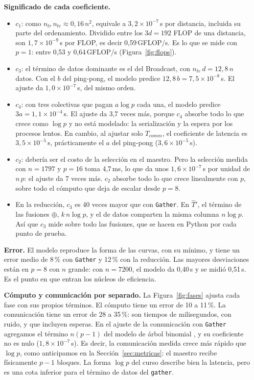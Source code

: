 \documentclass[11pt,a4paper]{article}
\newcommand{\ntr}{n_{tr}}
\newcommand{\nte}{n_{te}}
\begin{document}
\textbf{Significado de cada coeficiente.}
\begin{itemize}
  \item $c_1$: como $\ntr\,\nte\approx 0{,}16\,n^2$, equivale a $3{,}2\times10^{-7}$\,s por distancia, incluida su parte del ordenamiento. Dividido entre los $3d=192$ FLOP de una distancia, son $1{,}7\times10^{-9}$\,s por FLOP, es decir 0,59\,GFLOP/s. Es lo que se mide con $p=1$: entre 0,53 y 0,64\,GFLOP/s (Figura~\ref{fig:flops}).
  \item $c_3$: el término de datos dominante es el del Broadcast, con $\nte\,d=12{,}8\,n$ datos. Con el $b$ del ping-pong, el modelo predice $12{,}8\,b=7{,}5\times10^{-8}$\,s. El ajuste da $1{,}0\times10^{-7}$\,s, del mismo orden.
  \item $c_4$: con tres colectivas que pagan $a\log p$ cada una, el modelo predice $3a=1{,}1\times10^{-4}$\,s. El ajuste da 3,7 veces más, porque $c_4$ absorbe todo lo que crece como $\log p$ y no está modelado: la serialización y la espera por los procesos lentos. En cambio, al ajustar solo $T_{comm}$, el coeficiente de latencia es $3{,}5\times10^{-5}$\,s, prácticamente el $a$ del ping-pong ($3{,}6\times10^{-5}$\,s).
  \item $c_2$: debería ser el costo de la selección en el maestro. Pero la selección medida con $n=1797$ y $p=16$ toma 4,7\,ms, lo que da unos $1{,}6\times10^{-7}$\,s por unidad de $n\,p$: el ajuste da 7 veces más. $c_2$ absorbe todo lo que crece linealmente con $p$, sobre todo el cómputo que deja de escalar desde $p=8$.
  \item En la reducción, $c_3$ es 40 veces mayor que con \texttt{Gather}. En $\hat T'$, el término de las fusiones $\oplus$, $k\,n\log p$, y el de datos comparten la misma columna $n\log p$. Así que $c_3$ mide sobre todo las fusiones, que se hacen en Python por cada punto de prueba.
\end{itemize}

\textbf{Error.} El modelo reproduce la forma de las curvas, con su mínimo, y tiene un error medio de 8\,\% con \texttt{Gather} y 12\,\% con la reducción. Las mayores desviaciones están en $p=8$ con $n$ grande: con $n=7200$, el modelo da 0,40\,s y se midió 0,51\,s. Es el punto en que entran los núcleos de eficiencia.

\textbf{Cómputo y comunicación por separado.} La Figura~\ref{fig:fases} ajusta cada fase con sus propios términos. El cómputo tiene un error de 10 a 11\,\%. La comunicación tiene un error de 28 a 35\,\%: son tiempos de milisegundos, con ruido, y que incluyen esperas. En el ajuste de la comunicación con \texttt{Gather} agregamos el término $n(p-1)$ del modelo de árbol binomial \cite{thakur}, y su coeficiente no es nulo ($1{,}8\times10^{-7}$\,s). Es decir, la comunicación medida crece más rápido que $\log p$, como anticipamos en la Sección~\ref{sec:metricas}: el maestro recibe físicamente $p-1$ bloques. La forma $\log p$ del curso describe bien la latencia, pero es una cota inferior para el término de datos del \texttt{gather}.
\end{document}
